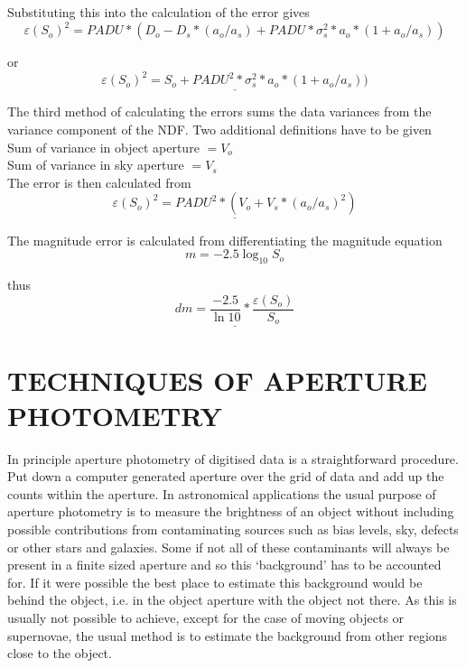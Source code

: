 Substituting this into the calculation of the error gives
\[\varepsilon( S_o )^2 = PADU * ( D_o - D_s * ( a_o / a_s ) +
                         PADU * \sigma_s^2 * a_o * ( 1 + a_o / a_s ) )\]

or
\begin{equation}\underline{
\varepsilon( S_o )^2 = S_o + PADU^2 * \sigma_s^2 * a_o * ( 1 + a_o / a_s ) )
}\end{equation}

The third method of calculating the errors sums the data variances from
the variance component of the NDF. Two additional definitions
have to be given\\

Sum of variance in object aperture       $= V_o$\\
Sum of variance in sky aperture          $= V_s$\\

The error is then calculated from
\begin{equation}\underline{
\varepsilon( S_o )^2 = PADU^2 * ( V_o + V_s * ( a_o / a_s )^2 )
}\end{equation}

The magnitude error is calculated from differentiating the magnitude equation
\[m=-2.5\log_{10}S_o\]

thus
\[\underline{dm=\frac{-2.5}{\ln10}*\frac{\varepsilon(S_o)}{S_o}}\]

\newpage
\section{TECHNIQUES OF APERTURE PHOTOMETRY}

In principle aperture photometry of digitised data is a straightforward
procedure. Put down a computer generated aperture over the grid of data
and add up the counts within the aperture. In astronomical applications the
usual purpose of aperture photometry is to measure the brightness of an
object without including possible contributions from contaminating sources
such as bias levels, sky, defects or other stars and galaxies.
Some if not all of these contaminants will always be present in a finite
sized aperture and so this `background' has to be accounted for.
If it were possible the best place to estimate this background would be
behind the object, i.e. in the object aperture with the object not there.
As this is usually not possible to achieve, except for the case of moving
objects or supernovae, the usual method is to estimate the background
from other regions close to the object.

